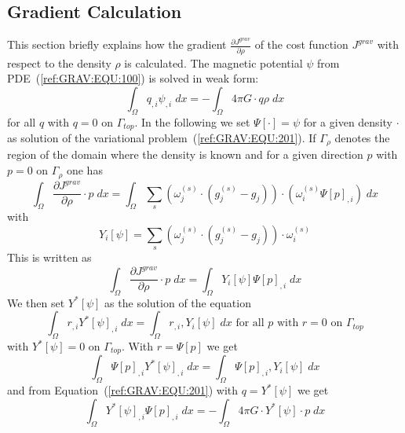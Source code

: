 \subsection{Gradient Calculation}
This section briefly explains how the gradient
$\frac{\partial J^{grav}}{\partial \rho}$ of the cost function $J^{grav}$ with
respect to the density $\rho$ is calculated.
The magnetic potential $\psi$ from PDE~(\ref{ref:GRAV:EQU:100}) is solved in
weak form:
\begin{equation}\label{ref:GRAV:EQU:201}
\int_{\Omega} q_{,i} \psi_{,i} \; dx  = - \int_{\Omega}  4\pi G \cdot q \rho\; dx 
\end{equation} 
for all $q$ with $q=0$ on $\Gamma_{top}$.
In the following we set $\Psi[\cdot]=\psi$ for a given density $\cdot$ as
solution of the variational problem~(\ref{ref:GRAV:EQU:201}).
If $\Gamma_{\rho}$ denotes the region of the domain where the density is known
and for a given direction $p$ with $p=0$ on $\Gamma_{\rho}$ one has
\begin{equation}\label{ref:GRAV:EQU:201}
\int_{\Omega}   \frac{\partial J^{grav}}{\partial \rho} \cdot p \; dx  =  \int_{\Omega}  
\sum_{s} (\omega^{(s)}_j \cdot 
(g^{(s)}_j-g_{j}) ) \cdot ( \omega^{(s)}_i \Psi[p]_{,i})  \; dx  
\end{equation} 
with 
\begin{equation}\label{ref:GRAV:EQU:202c}
Y_i[\psi]=  \sum_{s} (\omega^{(s)}_j \cdot 
(g^{(s)}_j-g_{j}) ) \cdot  \omega^{(s)}_i
\end{equation} 
This is written as 
\begin{equation}\label{ref:GRAV:EQU:201}
\int_{\Omega}   \frac{\partial J^{grav}}{\partial \rho} \cdot p \;  dx  = \int_{\Omega}  
Y_i[\psi] \Psi[p]_{,i} \; dx  
\end{equation} 
We then set $Y^*[\psi]$ as the solution of the equation 
\begin{equation}\label{ref:GRAV:EQU:202d}
\int_{\Omega} r_{,i} Y^*[\psi]_{,i} \; dx  =  \int_{\Omega} r_{,i} ,Y_i[\psi]  \; dx  \mbox{ for all } p \mbox{ with } r=0 \mbox{ on } \Gamma_{top}
\end{equation} 
with $Y^*[\psi]=0$ on $\Gamma_{top}$. With $r=\Psi[p]$ we get
\begin{equation}\label{ref:GRAV:EQU:202d}
\int_{\Omega} \Psi[p]_{,i} Y^*[\psi]_{,i} \; dx  =  \int_{\Omega} \Psi[p]_{,i} ,Y_i[\psi]  \; dx
\end{equation} 
and from Equation~(\ref{ref:GRAV:EQU:201}) with $q=Y^*[\psi]$ we get
\begin{equation}\label{ref:GRAV:EQU:20e}
\int_{\Omega} Y^*[\psi]_{,i}  \Psi[p]_{,i} \; dx  = - \int_{\Omega}  4\pi G \cdot Y^*[\psi] \cdot  p\;  dx  
\end{equation}
